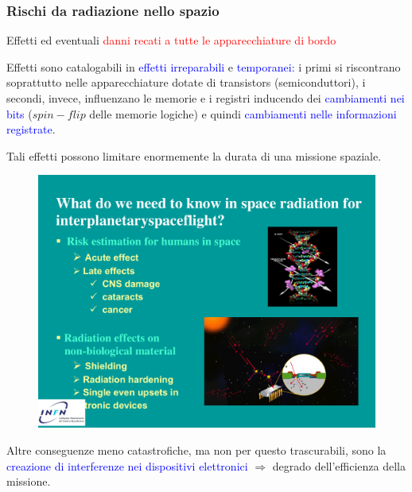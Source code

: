 \documentclass[9pt]{beamer}
\begin{document}
	



\begin{frame} [fragile]
	\frametitle{Rischi da radiazione nello spazio}
\begin{block}{}
\centering
Effetti ed eventuali \textcolor{red}{danni recati a tutte le apparecchiature di bordo}
\end{block}

Effetti sono catalogabili in \textcolor{blue}{effetti irreparabili} e \textcolor{blue}{temporanei:} i primi si riscontrano soprattutto nelle apparecchiature dotate di transistors (semiconduttori), i secondi, invece, influenzano le memorie e i registri inducendo dei \textcolor{blue}{cambiamenti nei bits} ($spin-flip$ delle memorie logiche) e quindi  \textcolor{blue}{cambiamenti nelle informazioni registrate}.
\newline

Tali effetti possono limitare enormemente la durata di una missione spaziale.
\newline

\end{frame}


\begin{frame} [fragile]
\begin{figure}
	  \centering
			\includegraphics[scale=0.80]{figures/fig3_3.pdf}
		\end{figure}

Altre conseguenze meno catastrofiche, ma non per questo trascurabili, sono la  \textcolor{blue}{creazione di interferenze nei dispositivi elettronici} $\Longrightarrow$ degrado dell'efficienza della missione. 

\end{frame}
\end{document}
